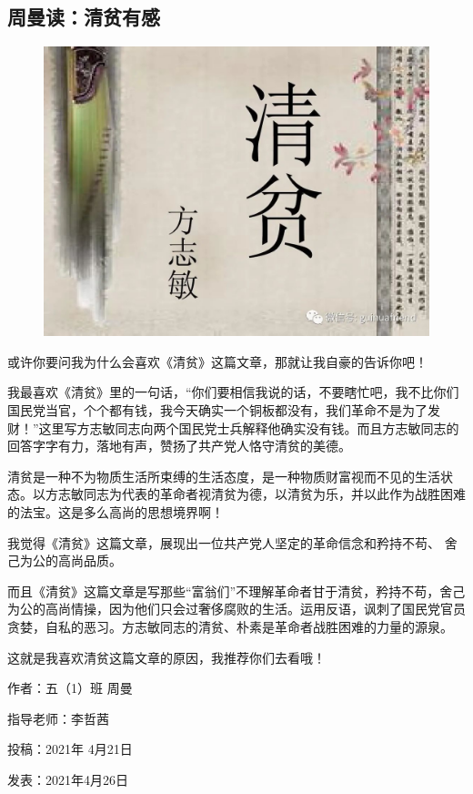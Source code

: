 \vspace{10pt}

{\centering\subsection*{周曼读：清贫有感}}


\renewcommand{\leftmark}{周曼读：清贫有感}

\begin{figure}[htbp]

\centering

\includegraphics[width = .5\textwidth]{./ch/36.jpg}

\end{figure}



或许你要问我为什么会喜欢《清贫》这篇文章，那就让我自豪的告诉你吧！



我最喜欢《清贫》里的一句话，“你们要相信我说的话，不要瞎忙吧，我不比你们国民党当官，个个都有钱，我今天确实一个铜板都没有，我们革命不是为了发财！”这里写方志敏同志向两个国民党士兵解释他确实没有钱。而且方志敏同志的回答字字有力，落地有声，赞扬了共产党人恪守清贫的美德。

清贫是一种不为物质生活所束缚的生活态度，是一种物质财富视而不见的生活状态。以方志敏同志为代表的革命者视清贫为德，以清贫为乐，并以此作为战胜困难的法宝。这是多么高尚的思想境界啊！

我觉得《清贫》这篇文章，展现出一位共产党人坚定的革命信念和矜持不苟、 舍己为公的高尚品质。

而且《清贫》这篇文章是写那些“富翁们”不理解革命者甘于清贫，矜持不苟，舍己为公的高尚情操，因为他们只会过奢侈腐败的生活。运用反语，讽刺了国民党官员贪婪，自私的恶习。方志敏同志的清贫、朴素是革命者战胜困难的力量的源泉。

这就是我喜欢清贫这篇文章的原因，我推荐你们去看哦！







\vspace{10pt}



作者：五（1）班 周曼



指导老师：李哲茜



投稿：2021年 4月21日



发表：2021年4月26日






                



\vspace{10pt}

\hline



